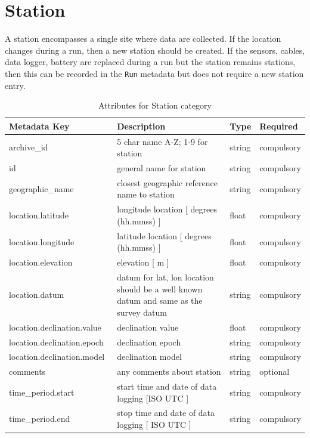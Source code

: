 \documentclass{article}
\begin{document}
\newpage
\section{Station}

A station encompasses a single site where data are collected. If the location changes during a run, then a new station should be created. If the sensors, cables, data logger, battery are replaced during a run but the station remains stations, then this can be recorded in the \verb|Run| metadata but does not require a new station entry.

\begin{table}[htb!]
    \caption[Attributes for Station]{Attributes for Station category}
    \begin{tabular}{|l|p{3in}|l|l|}
        \hline
        \textbf{Metadata Key} & \textbf{Description} & \textbf{Type} & \textbf{Required} \\ \hline
        archive\_id\ & 5 char name {A-Z; 1-9} for station & string & compulsory \\ \hline
        id\ & general name for station & string & compulsory \\ \hline
        geographic\_name\ & closest geographic reference name to station  & string & compulsory \\ \hline
        location.latitude\ & longitude location [ degrees (hh.mmss) ] & float & compulsory \\ \hline
        location.longitude\ & latitude location [ degrees (hh.mmss) ] & float & compulsory \\ \hline
        location.elevation\ & elevation [ m ] & float & compulsory \\ \hline
        location.datum\ & datum for lat, lon location should be a well known datum and same as the survey datum & string & compulsory \\ \hline
        location.declination.value\ & declination value & float & compulsory \\ \hline
        location.declination.epoch\ & declination epoch & string & compulsory \\ \hline
        location.declination.model\ & declination model & string & compulsory \\ \hline
        comments\ & any comments about station & string & optional \\ \hline 
        time\_period.start\ & start time and date of data logging [ISO UTC ] & string & compulsory \\ \hline
        time\_period.end\ & stop time and date of data logging  [ ISO UTC ] & string & compulsory \\ \hline

\end{tabular}
\end{table}
\end{document}
